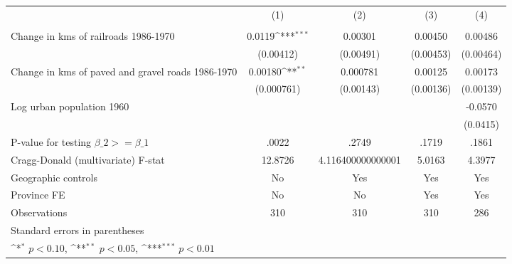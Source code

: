 {
\def\sym#1{\ifmmode^{#1}\else\(^{#1}\)\fi}
\begin{tabular}{l*{4}{c}}
\hline\hline
                &\multicolumn{1}{c}{(1)}&\multicolumn{1}{c}{(2)}&\multicolumn{1}{c}{(3)}&\multicolumn{1}{c}{(4)}\\
                &\multicolumn{1}{c}{}&\multicolumn{1}{c}{}&\multicolumn{1}{c}{}&\multicolumn{1}{c}{}\\
\hline
Change in kms of railroads 1986-1970&   0.0119\sym{***}&  0.00301         &  0.00450         &  0.00486         \\
                &(0.00412)         &(0.00491)         &(0.00453)         &(0.00464)         \\
[1em]
Change in kms of paved and gravel roads 1986-1970&  0.00180\sym{**} & 0.000781         &  0.00125         &  0.00173         \\
                &(0.000761)         &(0.00143)         &(0.00136)         &(0.00139)         \\
[1em]
Log urban population 1960&                  &                  &                  &  -0.0570         \\
                &                  &                  &                  & (0.0415)         \\
\hline
P-value for testing $\beta\_{2} >= \beta\_{1}$&    .0022         &    .2749         &    .1719         &    .1861         \\
Cragg-Donald (multivariate) F-stat&  12.8726         &4.116400000000001         &   5.0163         &   4.3977         \\
Geographic controls&       No         &      Yes         &      Yes         &      Yes         \\
Province FE     &       No         &       No         &      Yes         &      Yes         \\
Observations    &      310         &      310         &      310         &      286         \\
\hline\hline
\multicolumn{5}{l}{\footnotesize Standard errors in parentheses}\\
\multicolumn{5}{l}{\footnotesize \sym{*} \(p<0.10\), \sym{**} \(p<0.05\), \sym{***} \(p<0.01\)}\\
\end{tabular}
}
